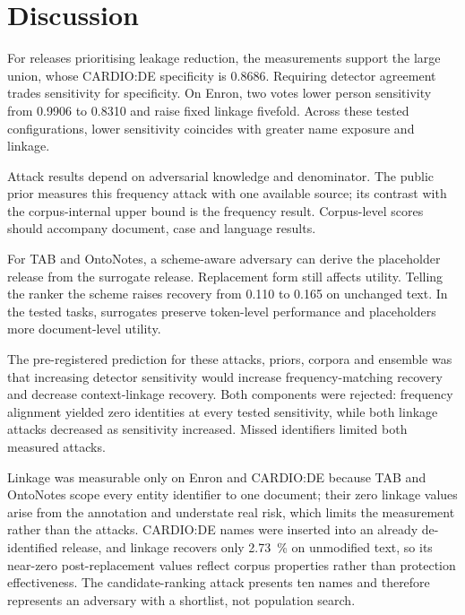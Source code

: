 \section{Discussion}\label{sec:discussion}

For releases prioritising leakage reduction, the measurements support the large union, whose
CARDIO:DE specificity is 0.8686. Requiring detector agreement trades sensitivity for specificity.
On Enron, two votes lower person sensitivity from 0.9906 to 0.8310 and raise
fixed linkage fivefold. Across these tested configurations, lower sensitivity coincides with greater
name exposure and linkage.

Attack results depend on adversarial knowledge and denominator. The public prior measures this
frequency attack with one available source; its contrast with the corpus-internal upper bound is the
frequency result. Corpus-level scores should accompany document, case and language results.

For TAB and OntoNotes, a scheme-aware adversary can derive the placeholder release from the surrogate
release. Replacement form still affects utility. Telling the ranker the scheme raises recovery from
0.110 to 0.165 on unchanged text. In the tested tasks, surrogates preserve token-level performance
and placeholders more document-level utility.

The pre-registered prediction for these attacks, priors, corpora and ensemble was that increasing detector sensitivity would increase frequency-matching recovery and decrease context-linkage recovery. Both components were rejected: frequency alignment yielded zero identities at every tested sensitivity, while both linkage attacks decreased as sensitivity increased. Missed identifiers limited both measured attacks.

Linkage was measurable only on Enron and CARDIO:DE because TAB and OntoNotes scope every entity identifier to one document; their zero linkage values arise from the annotation and understate real risk, which limits the measurement rather than the attacks. CARDIO:DE names were inserted into an already de-identified release, and linkage recovers only \SI{2.73}{\percent} on unmodified text, so its near-zero post-replacement values reflect corpus properties rather than protection effectiveness. The candidate-ranking attack presents ten names and
therefore represents an adversary with a shortlist, not population search. 